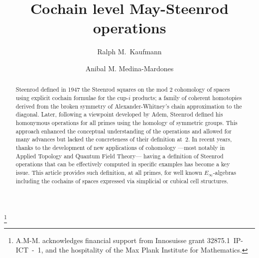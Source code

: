 \documentclass[A4]{amsart}
\theoremstyle{definition}
\begin{document}
	
\title{Cochain level May-Steenrod operations}

\author[R. Kaufmann]{Ralph M.\ Kaufmann}
\address{Department of Mathematics, Department of Physics and Astronomy, Purdue University}

\author[A. Medina-Mardones]{Anibal M. Medina-Mardones}
\address{Laboratory for Topology and Neuroscience, École Polytechnique Fédérale de Lausanne, Switzerland}
\address{Department of Mathematics, University of Notre Dame du Lac, Notre Dame, IN, USA}
\thanks{A.M-M. acknowledges financial support from Innosuisse grant \mbox{32875.1 IP-ICT - 1}, and the hospitality of the Max Plank Institute for Mathematics.}


\begin{abstract}
	Steenrod defined in 1947 the Steenrod squares on the mod 2 cohomology of spaces using explicit cochain formulae for the cup-$i$ products; a family of coherent homotopies derived from the broken symmetry of Alexander-Whitney's chain approximation to the diagonal. Later, following a viewpoint developed by Adem, Steenrod defined his homonymous operations for all primes using the homology of symmetric groups. This approach enhanced the conceptual understanding of the operations and allowed for many advances but lacked the concreteness of their definition at~$2$. In recent years, thanks to the development of new applications of cohomology ---most notably in Applied Topology and Quantum Field Theory--- having a definition of Steenrod operations that can be effectively computed in specific examples has become a key issue. This article provides such definition, at all primes, for well known $E_\infty$-algebras including the cochains of spaces expressed via simplicial or cubical cell structures.
\end{abstract}

\maketitle

\tableofcontents









\newpage
\appendix

 

	
\end{document}

